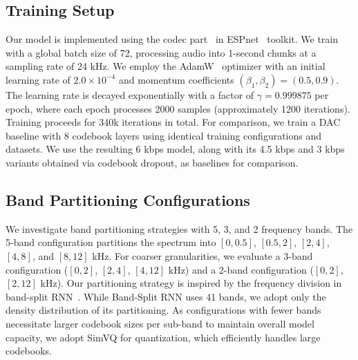 \documentclass[11pt]{article}
\begin{document}

\subsection{Training Setup}
\label{sec:training_details}
Our model is implemented using the codec part~\cite{shi2024espnet} in ESPnet~\cite{watanabe2018espnet} toolkit. We train with a global batch size of 72, processing audio into 1-second chunks at a sampling rate of 24 kHz. We employ the AdamW~\cite{loshchilov2017decoupled} optimizer with an initial learning rate of $2.0 \times 10^{-4}$ and momentum coefficients $(\beta_1, \beta_2) = (0.5, 0.9)$. The learning rate is decayed exponentially with a factor of $\gamma = 0.999875$ per epoch, where each epoch processes 2000 samples (approximately 1200 iterations). Training proceeds for 340k iterations in total.
For comparison, we train a DAC baseline with 8 codebook layers using identical training configurations and datasets. We use the resulting 6 kbps model, along with its 4.5 kbps and 3 kbps variants obtained via codebook dropout, as baselines for comparison.


\subsection{Band Partitioning Configurations}
We investigate band partitioning strategies with 5, 3, and 2 frequency bands. The 5-band configuration partitions the spectrum into $[0, 0.5]$, $[0.5, 2]$, $[2, 4]$, $[4, 8]$, and $[8, 12]$ kHz. For coarser granularities, we evaluate a 3-band configuration ($[0, 2]$, $[2, 4]$, $[4, 12]$ kHz) and a 2-band configuration ($[0, 2]$, $[2, 12]$ kHz). Our partitioning strategy is inspired by the frequency division in band-split RNN~\cite{luo2023music}. While Band-Split RNN uses 41 bands, we adopt only the density distribution of its partitioning. As configurations with fewer bands necessitate larger codebook sizes per sub-band to maintain overall model capacity, we adopt SimVQ\cite{zhu2024addressing} for quantization, which efficiently handles large codebooks.
\end{document}
